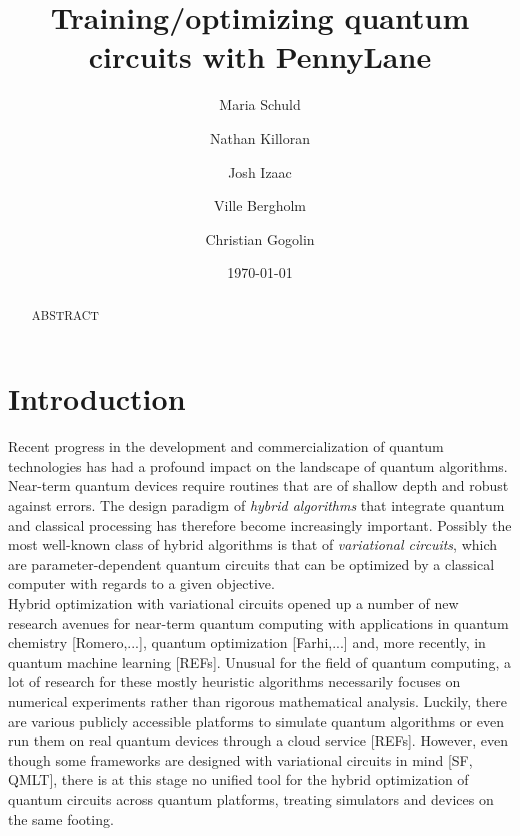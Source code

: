 \documentclass[aps,pra,10pt,twocolumn,groupedaddress,nofootinbib]{revtex4-1}
\theoremstyle{plain}
\begin{document}
\title{Training/optimizing quantum circuits with PennyLane}
\author{Maria Schuld}
\author{Nathan Killoran}
\author{Josh Izaac}
\author{Ville Bergholm}
\author{Christian Gogolin}
\date{\today}

\begin{abstract}
ABSTRACT
\end{abstract}

\maketitle


\section{Introduction}

Recent progress in the development and commercialization of quantum technologies has had a profound impact on the landscape of quantum algorithms. Near-term quantum devices require routines that are of shallow depth and robust against errors. The design paradigm of \textit{hybrid algorithms} that integrate quantum and classical processing has therefore become increasingly important. Possibly the most well-known class of hybrid algorithms is that of \textit{variational circuits}, which are parameter-dependent quantum circuits that can be optimized by a classical computer with regards to a given objective. \\

Hybrid optimization with variational circuits opened up a number of new research avenues for near-term quantum computing with applications in quantum chemistry [Romero,...], quantum optimization [Farhi,...] and, more recently, in quantum machine learning [REFs]. Unusual for the field of quantum computing, a lot of research for these mostly heuristic algorithms necessarily focuses on numerical experiments rather than rigorous mathematical analysis. Luckily, there are various publicly accessible platforms to simulate quantum algorithms or even run them on real quantum devices through a cloud service [REFs]. However, even though some frameworks are designed with variational circuits in mind [SF, QMLT], there is at this stage no unified tool for the hybrid optimization of quantum circuits across quantum platforms, treating simulators and devices on the same footing. \\
\end{document}
